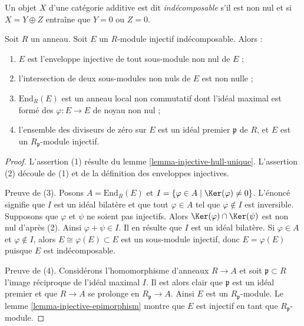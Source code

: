 \begin{definition}
\label{definition-indecomposable}
Un objet $X$ d'une catégorie additive est dit {\it indécomposable}
s'il est non nul et si $X = Y \oplus Z$ entraîne que $Y = 0$ ou $Z = 0$.
\end{definition}

\begin{lemma}
\label{lemma-indecomposable-injective}
Soit $R$ un anneau. Soit $E$ un $R$-module injectif indécomposable.
Alors :
\begin{enumerate}
\item $E$ est l'enveloppe injective de tout sous-module non nul de $E$ ;
\item l'intersection de deux sous-modules non nuls de $E$ est non nulle ;
\item $\text{End}_R(E)$ est un anneau local non commutatif dont l'idéal maximal
est formé des $\varphi : E \to E$ de noyau non nul ;
\item l'ensemble des diviseurs de zéro sur $E$ est un idéal premier $\mathfrak p$
de $R$, et $E$ est un $R_\mathfrak p$-module injectif.
\end{enumerate}
\end{lemma}

\begin{proof}
L'assertion (1) résulte du lemme \ref{lemma-injective-hull-unique}.
L'assertion (2) découle de (1) et de la définition des enveloppes injectives.

\medskip\noindent
Preuve de (3). Posons $A = \text{End}_R(E)$ et $I = \{\varphi \in A \mid \Ker(\varphi) \not = 0\}$.
L'énoncé signifie que $I$ est un idéal bilatère et que tout
$\varphi \in A$ tel que $\varphi \not \in I$ est inversible.
Supposons que $\varphi$ et $\psi$ ne soient pas injectifs.
Alors $\Ker(\varphi) \cap \Ker(\psi)$ est non nul d'après (2).
Ainsi $\varphi + \psi \in I$. Il en résulte que $I$ est un idéal bilatère.
Si $\varphi \in A$ et $\varphi \not \in I$, alors $E \cong \varphi(E) \subset E$ est un sous-module injectif,
donc $E = \varphi(E)$ puisque $E$ est indécomposable.

\medskip\noindent
Preuve de (4). Considérons l'homomorphisme d'anneaux $R \to A$ et soit $\mathfrak p \subset R$
l'image réciproque de l'idéal maximal $I$. Il est alors clair
que $\mathfrak p$ est un idéal premier et que $R \to A$ se prolonge en $R_\mathfrak p \to A$.
Ainsi $E$ est un $R_\mathfrak p$-module.
Le lemme \ref{lemma-injective-epimorphism} montre que $E$ est injectif en tant que $R_\mathfrak p$-module.
\end{proof}

